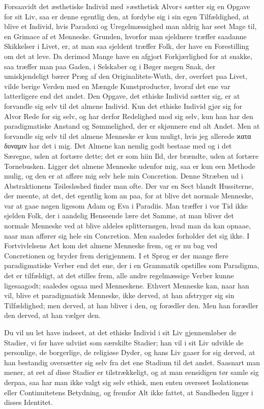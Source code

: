\documentclass[12pt,a4paper]{article}
\begin{document}
Forsaavidt det æsthetiske Individ med »æsthetisk Alvor« sætter sig en Opgave for sit Liv, saa er denne egentlig den, at fordybe sig i sin egen Tilfældighed, at blive et Individ, hvis Paradoxi og Uregelmæssighed man aldrig har seet Mage til, en Grimace af et Menneske. Grunden, hvorfor man sjeldnere træffer saadanne Skikkelser i Livet, er, at man saa sjeldent træffer Folk, der have en Forestilling om det at leve. Da derimod Mange have en afgjort Forkjærlighed for at snakke, saa træffer man paa Gaden, i Selskaber og i Bøger megen Snak, der umiskjendeligt bærer Præg af den Originalitets-Wuth, der, overført paa Livet, vilde berige Verden med en Mængde Kunstproducter, hvoraf det ene var latterligere end det andet. Den Opgave, det ethiske Individ sætter sig, er at forvandle sig selv til det almene Individ. Kun det ethiske Individ gjør sig for Alvor Rede for sig selv, og har derfor Redelighed mod sig selv, kun han har den paradigmatiske Anstand og Sømmelighed, der er skjønnere end alt Andet. Men at forvandle sig selv til det almene Menneske er kun muligt, hvis jeg allerede ϰατα δυναμιν har det i mig. Det Almene kan nemlig godt bestaae med og i det Særegne, uden at fortære dette; det er som hiin Ild, der brændte, uden at fortære Tornebusken. Ligger det almene Menneske udenfor mig, saa er kun een Methode mulig, og den er at afføre mig selv hele min Concretion. Denne Stræben ud i Abstraktionens Tøilesløshed finder man ofte. Der var en Sect blandt Hussiterne, der meente, at det, det egentlig kom an paa, for at blive det normale Menneske, var at gaae nøgen ligesom Adam og Eva i Paradiis. Man træffer i vor Tid ikke sjelden Folk, der i aandelig Henseende lære det Samme, at man bliver det normale Menneske ved at blive aldeles splitternøgen, hvad man da kan opnaae, naar man affører sig hele sin Concretion. Men saaledes forholder det sig ikke. I Fortvivlelsens Act kom det almene Menneske frem, og er nu bag ved Concretionen og bryder frem derigjennem. I et Sprog er der mange flere paradigmatiske Verber end det ene, der i en Grammatik opstilles som Paradigma, det er tilfældigt, at det stilles frem, alle andre regelmæssige Verber kunne ligesaagodt; saaledes ogsaa med Menneskene. Ethvert Menneske kan, naar han vil, blive et paradigmatisk Menneske, ikke derved, at han afstryger sig sin Tilfældighed; men derved, at han bliver i den, og forædler den. Men han forædler den derved, at han vælger den.

Du vil nu let have indseet, at det ethiske Individ i sit Liv gjennemløber de Stadier, vi før have udviist som særskilte Stadier; han vil i sit Liv udvikle de personlige, de borgerlige, de religiøse Dyder, og hans Liv gaaer for sig derved, at han bestandig oversætter sig selv fra det ene Stadium til det andet. Saasnart man mener, at eet af disse Stadier er tilstrækkeligt, og at man eensidigen tør samle sig derpaa, saa har man ikke valgt sig selv ethisk, men enten overseet Isolationens eller Continuitetens Betydning, og fremfor Alt ikke fattet, at Sandheden ligger i disses Identitet.
\end{document}
